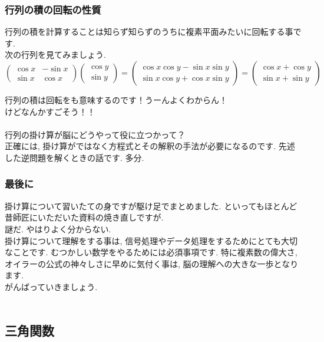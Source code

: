\documentclass[11pt,a4paper]{jsarticle}
\begin{document}
\subsubsection{行列の積の回転の性質}
行列の積を計算することは知らず知らずのうちに複素平面みたいに回転する事です. \\
次の行列を見てみましょう.\\
\[
  \left(	
  \begin{array}{cc}
  \cos x & -\sin x \\
  \sin x & \cos x
  \end{array}
  \right)
  \left(
  \begin{array}{c}
  \cos y \\
  \sin y
  \end{array}
  \right)
  =
  \left(
  \begin{array}{l}
  \cos x\cos y - \sin x\sin y\\
  \sin x\cos y + \cos x\sin y
  \end{array}
  \right)
  =
  \left(
  \begin{array}{c}
  \cos x + \cos y\\
  \sin x + \sin y
  \end{array}
  \right)
\]

行列の積は回転をも意味するのです！うーんよくわからん！\\
けどなんかすごそう！！\\
\\
行列の掛け算が脳にどうやって役に立つかって？\\
正確には, 掛け算がではなく方程式とその解釈の手法が必要になるのです. 先述した逆問題を解くときの話です. 多分. 
\\
\subsubsection{最後に}
掛け算について習いたての身ですが駆け足でまとめました. といってもほとんど昔師匠にいただいた資料の焼き直しですが. \\
謎だ. やはりよく分からない.\\
掛け算について理解をする事は, 信号処理やデータ処理をするためにとても大切なことです. むつかしい数学をやるためには必須事項です. 特に複素数の偉大さ, オイラーの公式の神々しさに早めに気付く事は, 脳の理解への大きな一歩となります.\\
がんばっていきましょう.\\
\\

\subsection{三角関数 \label{trigonometry}}
\end{document}
